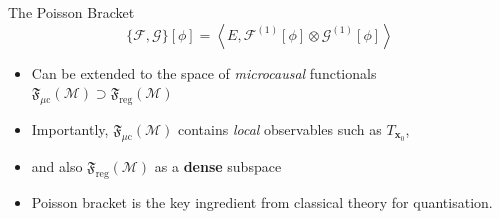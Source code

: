 \documentclass[pdf, fleqn, compress, handout]{beamer}
\newcommand{\mathsterm}[1]{{\itshape\color{dark-teal!80}#1}}
\newcommand{\ourex}[1]{{\itshape\color{viridian!70!black}#1}}
\begin{document}

\begin{frame}{The Poisson Bracket}
	\vspace{-2em}
	\begin{equation}
		\{\mathcal{F}, \mathcal{G}\}[\phi]
			= 
		\left\langle 
			E,
			\mathcal{F}^{(1)}[\phi]
				\otimes
			\mathcal{G}^{(1)}[\phi]
		\right\rangle
	\end{equation}
	\begin{itemize}
		\item	Can be extended to the space of \mathsterm{microcausal} functionals
				$\mathfrak{F}_{\mu \mathrm{c}}(\mathcal{M}) \supset 
				\mathfrak{F}_\mathrm{reg}(\mathcal{M})$
		\pause
		\item	Importantly, $\mathfrak{F}_{\mu \mathrm{c}}(\mathcal{M})$ contains
				\mathsterm{local} observables such as \ourex{$T_{\mathbf{x}_0}$},
		\pause
		\item	and also $\mathfrak{F}_\mathrm{reg}(\mathcal{M})$ as a \textbf{dense} subspace
		\pause
		\item	Poisson bracket is the key ingredient from classical theory for quantisation.
	\end{itemize}
\end{frame}
\end{document}
